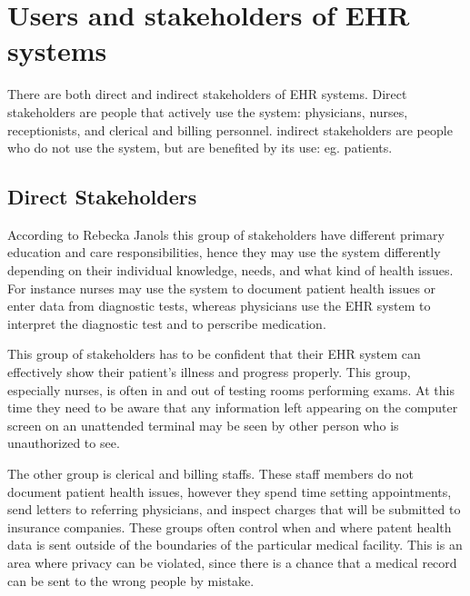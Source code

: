 \documentclass[14pt]{article}
\begin{document}
\section{Users and stakeholders of \gls{EHR} systems} 
\label{sec:People}
There are both direct and indirect stakeholders of \gls{EHR} systems. Direct stakeholders are people that actively use the system: physicians, nurses, receptionists, and clerical and billing personnel. indirect stakeholders are people who do not use the system, but are benefited by its use: eg. patients.

\subsection{Direct Stakeholders}
\label{sec:peopleDirect}
According to Rebecka Janols \cite{Janols} this group of stakeholders have different primary education and care responsibilities, hence they may use the system differently depending on their individual knowledge, needs, and what kind of health issues. For instance nurses may use the system to document patient health issues or enter data from diagnostic tests, whereas physicians use the \gls{EHR} system to interpret the diagnostic test and to perscribe medication. 

This group of stakeholders has to be confident that their \gls{EHR} system can effectively show their patient’s illness and progress properly. This group, especially nurses, is often in and out of testing rooms performing exams. At this time they need to be aware that any information left appearing on the computer screen on an unattended terminal may be seen by other person who is unauthorized to see. 

The other group is clerical and billing staffs. These staff members do not document patient health issues, however they spend time setting appointments, send letters to referring physicians, and inspect charges that will be submitted to insurance companies. These groups often control when and where patent health data is sent outside of the boundaries of the particular medical facility. This is an area where privacy can be violated, since there is a chance that a medical record can be sent to the wrong people by mistake. 
\end{document}
